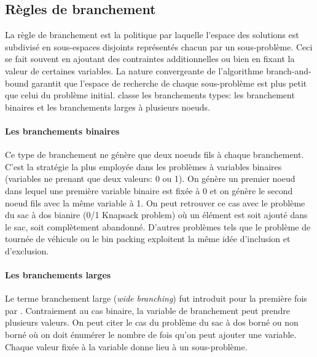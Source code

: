 \documentclass[12pt,a4paper,oneside]{book}
\theoremstyle{definition}
\begin{document}
	\subsection{Règles de branchement}
	La règle de branchement est la politique par laquelle l'espace des solutions est subdivisé en sous-espaces disjoints représentés chacun par un sous-problème. Ceci se fait souvent en ajoutant des contraintes additionnelles ou bien en fixant la valeur de certaines variables. La nature convergeante de l'algorithme branch-and-bound \cite{boyd2003notes} garantit que l'espace de recherche de chaque sous-problème est plus petit que celui du problème initial. \cite{MORRISON201679} classe les branchements types: les branchement binaires et les branchements larges à plusieurs noeuds.
	
	\paragraph{Les branchements binaires}
	Ce type de branchement ne génère que deux noeuds fils à chaque branchement. C'est la stratégie la plus employée dans les problèmes à variables binaires (variables ne prenant que deux valeurs: 0 ou 1). On génère un premier noeud dans lequel une première variable binaire est fixée à 0 et on génère le second noeud fils avec la même variable à 1. On peut retrouver ce cas avec le problème du sac à dos bianire (0/1 Knapsack problem) où un élément est soit ajouté dans le sac, soit complètement abandonné. D'autres problèmes tels que le problème de tournée de véhicule ou le bin packing exploitent la même idée d'inclusion et d'exclusion.
	
	\paragraph{Les branchements larges}
	Le terme branchement large (\textit{wide branching}) fut introduit pour la première fois par \cite{morrison2014wide}. Contraiement au cas binaire, la variable de branchement peut prendre plusieurs valeurs. On peut citer le cas du problème du sac à dos borné ou non borné où on doit énumérer le nombre de fois qu'on peut ajouter une variable. Chaque valeur fixée à la variable donne lieu à un sous-problème. 
	
\end{document}
